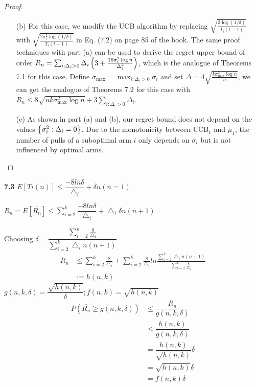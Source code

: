 \begin{enumerate}[(a)]
\begin{proof}
\begin{enumerate}
    \item[(b)] For this case, we modify the UCB algorithm by replacing $\sqrt{\frac{2\log (1/\delta)}{T_i(t-1)}}$ with $\sqrt{\frac{2\sigma_i^2 \log (1/\delta)}{T_i(t-1)}}$ in Eq. (7.2) on page 85 of the book. The same proof techniques with part (a) can be used to derive the regret upper bound of order $R_n = \sum_{i:\Delta_i>0}\Delta_i \left( 3 + \frac{16\sigma_i^2 \log n}{\Delta_i^2}\right)$, which is the analogue of Theorems 7.1 for this case. Define $\sigma_{\max} = \max_{i:\Delta_i>0}\sigma_i$ and set $\Delta = 4\sqrt{\frac{k\sigma_{\max}^2 \log n}{n}}$, we can get the analogue of Theorems 7.2 for this case with $R_n \le 8\sqrt{nk\sigma_{\max}^2 \log n} + 3\sum_{i:\Delta_i >0} \Delta_i$.

    \item[(c)] As shown in part (a) and (b), our regret bound does not depend on the values $\left\{ \sigma_i^2:\Delta_i=0 \right\}$. Due to the monotonicity between UCB$_1$ and $\mu_1$, the number of pulls of a suboptimal arm $i$ only depends on $\sigma_i$ but is not influenced by optimal arms. 
\end{enumerate}
\end{proof}

\noindent\textbf{7.3}
    $E[Ti(n)]\le\dfrac{-8ln\delta}{\bigtriangleup_i}+\delta n(n=1)$


    $R_n=E[\overline{R_n}]\le\sum^{k}_{i=2}\dfrac{-8ln\delta}{\bigtriangleup_i}+\bigtriangleup_i\delta n(n+1)$


    Choosing
    $\delta=\dfrac{\sum^{k}_{i=2}\frac{8}{\bigtriangleup_i}}{\sum^{k}_{i=2}\bigtriangleup_i   n(n+1)}$
    \begin{align*}
    R_n &\le\sum^{k}_{i=2}\frac{8}{\bigtriangleup_i}+\sum^{k}_{i=2}\frac{8}{\bigtriangleup_i}ln\frac{\sum^{k}_{i=2}\bigtriangleup_i n(n+1)}{\sum^{k}_{i=2}\frac{8}{\bigtriangleup_i}}\\
    &:=h(n,k)
    \end{align*}
    $g(n,k,\delta)=\dfrac{\sqrt{h(n,k)}}{\delta};f(n,k)=\sqrt{h(n,k)}$
    \begin{align*}
    P(\overline{R_n}\ge g(n,k,\delta)) &\le\dfrac{R_n}{g(n,k,\delta)}\\
    &\le\dfrac{h(n,k)}{g(n,k,\delta)}\\
    &=\dfrac{h(n,k)}{\sqrt{h(n,k)}}\delta\\
    &=\sqrt{h(n,k)}\delta\\
    &=f(n,k)\delta
    \end{align*}



\end{enumerate}
